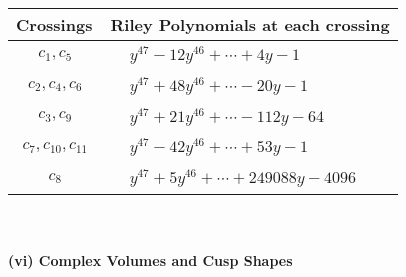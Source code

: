 \documentclass[1p]{elsarticle_modified}
\theoremstyle{definition}
\begin{document}
\begin{tabular}{m{50pt}|m{274pt}}
Crossings & \hspace{64pt}Riley Polynomials at each crossing \\
\hline $$\begin{aligned}c_{1},c_{5}\end{aligned}$$&$\begin{aligned}
&y^{47}-12 y^{46}+\cdots+4 y-1
\end{aligned}$\\
\hline $$\begin{aligned}c_{2},c_{4},c_{6}\end{aligned}$$&$\begin{aligned}
&y^{47}+48 y^{46}+\cdots-20 y-1
\end{aligned}$\\
\hline $$\begin{aligned}c_{3},c_{9}\end{aligned}$$&$\begin{aligned}
&y^{47}+21 y^{46}+\cdots-112 y-64
\end{aligned}$\\
\hline $$\begin{aligned}c_{7},c_{10},c_{11}\end{aligned}$$&$\begin{aligned}
&y^{47}-42 y^{46}+\cdots+53 y-1
\end{aligned}$\\
\hline $$\begin{aligned}c_{8}\end{aligned}$$&$\begin{aligned}
&y^{47}+5 y^{46}+\cdots+249088 y-4096
\end{aligned}$\\
\hline
\end{tabular}\\~\\
\newpage\flushleft \textbf{(vi) Complex Volumes and Cusp Shapes}
\end{document}
